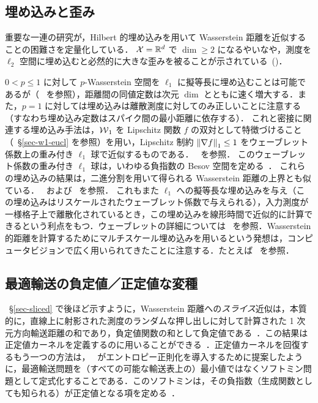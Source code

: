 \subsection{埋め込みと歪み}

重要な一連の研究が，Hilbert 的埋め込みを用いて Wasserstein 距離を近似することの困難さを定量化している．
%
$\mathcal{X}=\mathbb{R}^d$ で $\dim\geq 2$ になるやいなや，測度を $\ell_2$ 空間に埋め込むと必然的に大きな歪みを被ることが示されている~(\citet{naor-2005,andoni2015snowflake})．

$0 < p \leq 1$ に対して $p$-Wasserstein 空間を $\ell_1$ に擬等長に埋め込むことは可能であるが（~\citep{indyk,andoni2008earth,do2011sublinear} を参照），距離間の同値定数は次元 $\dim$ とともに速く増大する．また，$p=1$ に対しては埋め込みは離散測度に対してのみ正しいことに注意する（すなわち埋め込み定数はスパイク間の最小距離に依存する）．
%
これと密接に関連する埋め込み手法は，$\operatorname{\mathcal{W}}_1$ を Lipschitz 関数 $f$ の双対として特徴づけること（~\S\ref{sec-w1-eucl} を参照）を用い，Lipschitz 制約 $\left\| \nabla f \right\|_1 \leq 1$ をウェーブレット係数上の重み付き $\ell_1$ 球で近似するものである．~\citep{shirdhonkar2008approximate} を参照．
%
このウェーブレット係数の重み付き $\ell_1$ 球は，いわゆる負指数の Besov 空間を定める~\citep{leeb2016holder}．
%
これらの埋め込みの結果は，二進分割を用いて得られる Wasserstein 距離の上界とも似ている．~\citep[Prop. 1]{weed2017sharp} および~\citep{fournier2015rate} を参照．
%
これもまた $\ell_1$ への擬等長な埋め込みを与え（この埋め込みはリスケールされたウェーブレット係数で与えられる），入力測度が一様格子上で離散化されているとき，この埋め込みを線形時間で近似的に計算できるという利点をもつ．ウェーブレットの詳細については~\citep{mallat2008wavelet} を参照．Wasserstein 的距離を計算するためにマルチスケール埋め込みを用いるという発想は，コンピュータビジョンで広く用いられてきたことに注意する．たとえば~\citep{ling2006diffusion,grauman2005pyramid,CuturiNIPS2006,lazebnik2006beyond} を参照．

\subsection{最適輸送の負定値／正定値な変種}

~\S\ref{sec-sliced} で後ほど示すように，Wasserstein 距離への\emph{スライス}近似は，本質的に，直線上に射影された測度のランダムな押し出しに対して計算された 1 次元方向輸送距離の和であり，負定値関数の和として負定値である~\citep[\S 3.1.11]{berg84harmonic}．この結果は正定値カーネルを定義するのに用いることができる~\citep{kolouri2016sliced}．正定値カーネルを回復するもう一つの方法は，~\citet{kosowsky1994invisible} がエントロピー正則化を導入するために提案したように，最適輸送問題を（すべての可能な輸送表上の）最小値ではなくソフトミン問題として定式化することである．このソフトミンは，その負指数（生成関数としても知られる）が正定値となる項を定める~\citep{cuturi2012positivity}．





